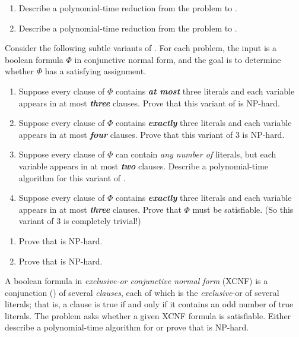 \begin{exercises}
\item
\begin{enumerate}
\item Describe a polynomial-time reduction from the  problem to .
\item Describe a polynomial-time reduction from the  problem to .
\end{enumerate}

\item Consider the following subtle variants of .
For each problem, the input is a boolean formula $\Phi$ in conjunctive normal form, and the goal is to determine whether $\Phi$ has a satisfying assignment.
\begin{enumerate}
\item Suppose every clause of $\Phi$ contains \textbf{\textit{at most}} three literals and each variable appears in at most \textbf{\textit{three}} clauses.
Prove that this variant of  is NP-hard.
\item Suppose every clause of $\Phi$ contains \textbf{\textit{exactly}} three literals and each variable appears in at most \textbf{\textit{four}} clauses.
Prove that this variant of 3 is NP-hard.
\item {} Suppose every clause of $\Phi$ can contain \textit{any number of} literals, but each variable appears in at most \textbf{\textit{two}} clauses.
Describe a polynomial-time algorithm for this variant of .
\item {} Suppose every clause of $\Phi$ contains \textbf{\textit{exactly}} three literals and each variable appears in at most \textbf{\textit{three}} clauses.
Prove that $\Phi$ must be satisfiable.
(So this variant of 3 is completely trivial!)
\end{enumerate}

\item
\begin{enumerate}
\item Prove that  is NP-hard.
\item Prove that  is NP-hard.
\end{enumerate}

\item A boolean formula in \textit{exclusive-or conjunctive normal form} (XCNF) is a conjunction () of several \textit{clauses}, each of which is the \textit{exclusive}-or of several literals; that is, a clause is true if and only if it contains an odd number of true literals.
The  problem asks whether a given XCNF formula is satisfiable.
Either describe a polynomial-time algorithm for  or prove that  is NP-hard.


\end{exercises}
